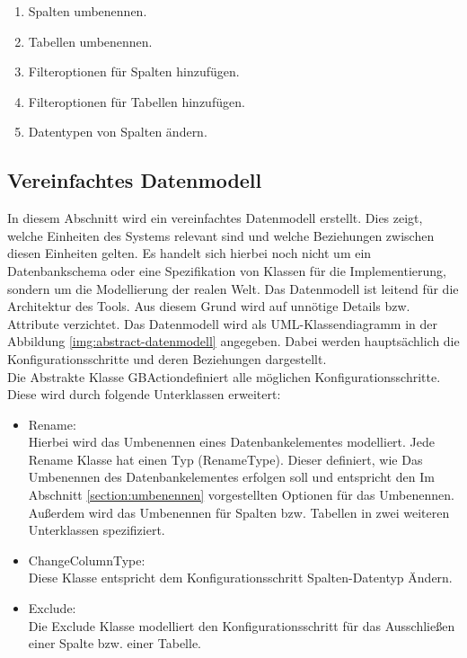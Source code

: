 \begin{enumerate}
	\item Spalten  umbenennen.
	\item Tabellen umbenennen.
	\item Filteroptionen für Spalten hinzufügen.
	\item Filteroptionen für Tabellen hinzufügen.
	\item Datentypen von Spalten ändern.
\end{enumerate}





\subsection{Vereinfachtes Datenmodell}
In diesem Abschnitt wird ein vereinfachtes Datenmodell erstellt. Dies zeigt, welche Einheiten des Systems relevant sind und welche Beziehungen zwischen diesen Einheiten gelten. Es handelt sich hierbei noch nicht um ein Datenbankschema oder eine Spezifikation von Klassen für die Implementierung, sondern um
die Modellierung der realen Welt. Das Datenmodell ist leitend für die Architektur des Tools. Aus diesem Grund wird auf unnötige Details bzw. Attribute verzichtet.
Das Datenmodell wird als UML-Klassendiagramm in der Abbildung \ref{img:abstract-datenmodell} angegeben. Dabei werden hauptsächlich die Konfigurationsschritte und deren Beziehungen dargestellt. \\
Die Abstrakte Klasse \glqq GBAction\grqq definiert alle möglichen Konfigurationsschritte. Diese wird durch folgende Unterklassen erweitert:
\begin{itemize}
	\item Rename: \\
	Hierbei wird das Umbenennen eines Datenbankelementes modelliert. Jede Rename Klasse hat einen Typ (RenameType). Dieser definiert, wie Das Umbenennen des Datenbankelementes erfolgen soll und entspricht den Im Abschnitt \ref{section:umbenennen} vorgestellten Optionen für das Umbenennen. Außerdem wird das Umbenennen für Spalten bzw. Tabellen in zwei weiteren Unterklassen spezifiziert.
	\item ChangeColumnType: \\
	Diese Klasse entspricht dem Konfigurationsschritt \glqq Spalten-Datentyp Ändern\grqq.  
	\item Exclude: \\
	Die Exclude Klasse modelliert den Konfigurationsschritt für das Ausschließen einer Spalte bzw. einer Tabelle.
	\end{itemize}
